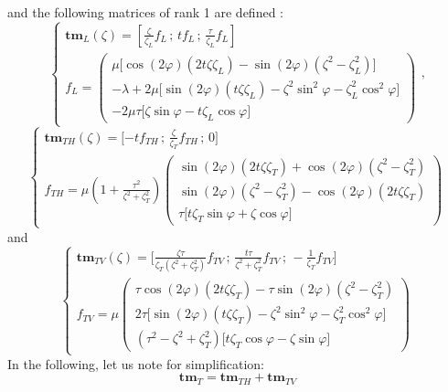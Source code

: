 and the following matrices of rank 1 are defined :
\begin{equation}
\left\{
\begin{matrix}
\textbf{tm}_L(\zeta)=\left[ \frac{\zeta}{\zeta_L} f_L\,; \, tf_L\,;  \, \frac{\tau}{\zeta_L}f_L
\right] \\
f_L = \begin{pmatrix}
\mu \lbrack \cos(2\varphi)(2t\zeta\zeta_L)-\sin(2\varphi)(\zeta^2-\zeta_L^2) \rbrack\\
-\lambda+2\mu \lbrack \sin(2\varphi)(t\zeta\zeta_L)-\zeta^2\sin^2\varphi-\zeta^2_L\cos^2\varphi\rbrack\\
-2\mu\tau\lbrack \zeta\sin\varphi -t\zeta_L\cos\varphi\rbrack
\end{pmatrix}
\end{matrix}
\right. ,
\label{C4:tmL}
\end{equation}
\begin{equation}
\left\{
\begin{matrix}
\textbf{tm}_{TH}(\zeta)=\lbrack -tf_{TH}\,;\, \frac{\zeta}{\zeta_T}f_{TH}\,;\, 0 \rbrack\\
f_{TH}=\mu\left(1+\frac{\tau^2}{\zeta^2+\zeta_T^2}\right) \begin{pmatrix}
\sin(2\varphi)(2t\zeta\zeta_T)+\cos(2\varphi)(\zeta^2-\zeta_T^2)\\
\sin(2\varphi)(\zeta^2-\zeta_T^2)-\cos(2\varphi)(2t\zeta\zeta_T)\\
\tau\lbrack t\zeta_T\sin\varphi+\zeta\cos\varphi\rbrack 
\end{pmatrix}
\end{matrix}
\right.
\label{C4:tmTH}
\end{equation}
and
\begin{equation}
\left\{
\begin{matrix}
\textbf{tm}_{TV}(\zeta)=\lbrack \frac{\zeta\tau}{\zeta_T(\zeta^2+\zeta_T^2)}f_{TV}\,;\, \frac{t\tau}{\zeta^2+\zeta_T^2}f_{TV}\,;\, -\frac{1}{\zeta_T}f_{TV} \rbrack\\
f_{TV}=\mu\begin{pmatrix}
\tau\cos(2\varphi)(2t\zeta\zeta_T)-\tau\sin(2\varphi)(\zeta^2-\zeta_T^2)\\
2\tau\lbrack \sin(2\varphi)(t\zeta\zeta_T)-\zeta^2\sin^2\varphi-\zeta_T^2\cos^2\varphi\rbrack\\
\left(\tau^2-\zeta^2+\zeta_T^2\right)\lbrack t\zeta_T\cos\varphi-\zeta\sin\varphi \rbrack
\end{pmatrix}
\end{matrix}
\right.
\label{C4:tmTV}
\end{equation}
In the following, let us note for simplification:
\begin{equation}
\mathbf{tm}_T=\mathbf{tm}_{TH}+\mathbf{tm}_{TV}
\end{equation}

